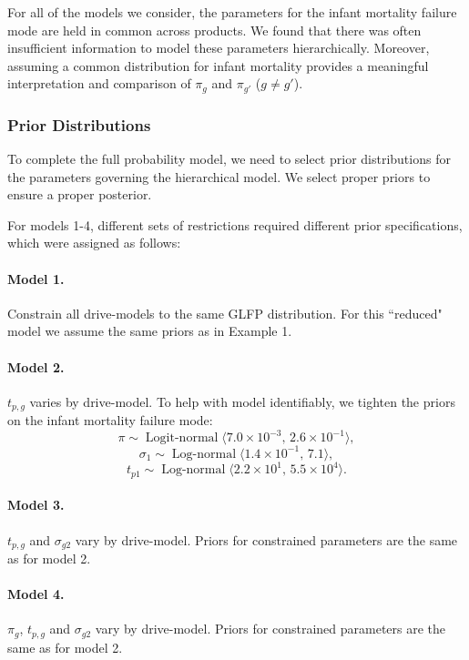 \documentclass[12pt]{article}
\newcommand{\op}{\operatorname}
\begin{document}
For all of the models we consider, the parameters for the infant mortality failure mode are held in common across products.  We found that there was often insufficient information to model these parameters hierarchically.  Moreover, assuming a common distribution for infant mortality provides a meaningful interpretation and comparison of $\pi_g$ and $\pi_{g'}$ ($g \neq g'$). 

\subsubsection{Prior Distributions}
\label{sec:Prior Distributions}
To complete the full probability model, we need to select prior distributions for the parameters governing the hierarchical model. We select proper priors to ensure a proper posterior.

For models 1-4, different sets of restrictions required different prior specifications, which were assigned as follows:

\paragraph{Model 1.} Constrain all drive-models to the same GLFP distribution. For this ``reduced" model we assume the same priors as in Example 1.

\paragraph{Model 2.} $t_{p,g}$ varies by drive-model. To help with model identifiably, we tighten the priors on the infant mortality failure mode:
$$ \pi \sim \op{Logit-normal}\langle 7.0\times 10^{-3},\, 2.6 \times 10^{-1} \rangle,$$
$$\sigma_1 \sim \op{Log-normal}\langle 1.4 \times 10^{-1},\, 7.1\rangle,$$ 
$$t_{p1} \sim \op{Log-normal} \langle 2.2 \times 10^1,\, 5.5 \times 10^{4} \rangle.$$

\paragraph{Model 3.} $t_{p,g}$ and $\sigma_{g2}$ vary by drive-model. Priors for constrained parameters are the same as for model 2.

\paragraph{Model 4.} $\pi_g$, $t_{p,g}$ and $\sigma_{g2}$ vary by drive-model. Priors for constrained parameters are the same as for model 2.
\end{document}

